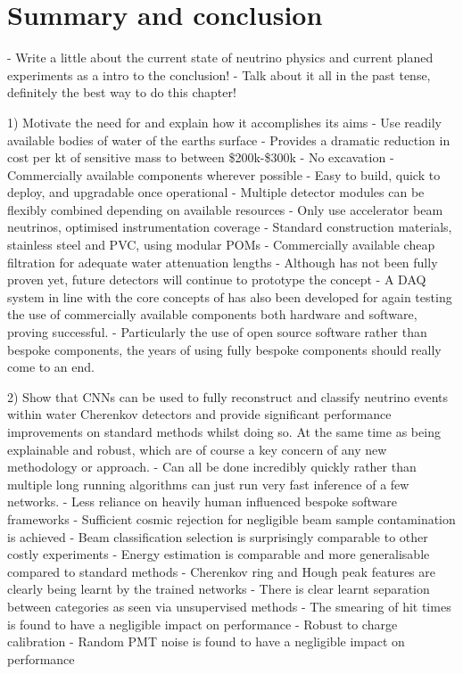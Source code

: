 \chapter{Summary and conclusion} %
\label{chap:conclusion} %

- Write a little about the current state of neutrino physics and current planed experiments as a
intro to the conclusion!
- Talk about it all in the past tense, definitely the best way to do this chapter!

1) Motivate the need for \chips and explain how it accomplishes its aims
    - Use readily available bodies of water of the earths surface
    - Provides a dramatic reduction in cost per kt of sensitive mass to between \$200k-\$300k
    - No excavation
    - Commercially available components wherever possible
    - Easy to build, quick to deploy, and upgradable once operational
    - Multiple detector modules can be flexibly combined depending on available resources
    - Only use accelerator beam neutrinos, optimised instrumentation coverage
    - Standard construction materials, stainless steel and PVC, using modular POMs
    - Commercially available cheap filtration for adequate water attenuation lengths
    - Although \chipsfive has not been fully proven yet, future \chips detectors will continue to
    prototype the concept
    - A DAQ system in line with the core concepts of \chips has also been developed for \chipsfive
    again testing the use of commercially available components both hardware and software, proving
    successful. 
    - Particularly the use of open source software rather than bespoke components, the years of
    using fully bespoke components should really come to an end.

2) Show that CNNs can be used to fully reconstruct and classify neutrino events within water
Cherenkov detectors and provide significant performance improvements on standard methods whilst
doing so. At the same time as being explainable and robust, which are of course a key concern of
any new methodology or approach. 
    - Can all be done incredibly quickly rather than multiple long running algorithms can just run
    very fast inference of a few networks.
    - Less reliance on heavily human influenced bespoke software frameworks
    - Sufficient cosmic rejection for negligible beam sample contamination is achieved
    - Beam classification selection is surprisingly comparable to other costly experiments
    - Energy estimation is comparable and more generalisable compared to standard methods
    - Cherenkov ring and Hough peak features are clearly being learnt by the trained networks
    - There is clear learnt separation between categories as seen via unsupervised methods
    - The smearing of hit times is found to have a negligible impact on performance
    - Robust to charge calibration
    - Random PMT noise is found to have a negligible impact on performance

